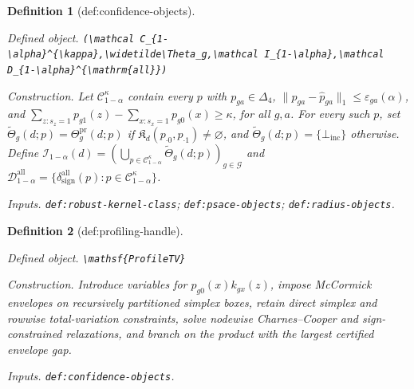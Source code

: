 \documentclass{article}
\newtheorem{definition}{Definition}
\begin{document}
\begin{definition}[def:confidence-objects]\label{def:confidence-objects}
\par\smallskip\noindent\emph{Defined object.} \texttt{(\textbackslash{}\allowbreak{}mathcal C\_\allowbreak{}\{1-\allowbreak{}\textbackslash{}\allowbreak{}alpha\}\allowbreak{}\textasciicircum{}\{\textbackslash{}\allowbreak{}kappa\}\allowbreak{},\allowbreak{}\textbackslash{}\allowbreak{}widetilde\textbackslash{}\allowbreak{}Theta\_\allowbreak{}g,\allowbreak{}\textbackslash{}\allowbreak{}mathcal I\_\allowbreak{}\{1-\allowbreak{}\textbackslash{}\allowbreak{}alpha\}\allowbreak{},\allowbreak{}\textbackslash{}\allowbreak{}mathcal D\_\allowbreak{}\{1-\allowbreak{}\textbackslash{}\allowbreak{}alpha\}\allowbreak{}\textasciicircum{}\{\textbackslash{}\allowbreak{}mathrm\{all\}\allowbreak{}\}\allowbreak{})}
\par\smallskip\noindent\emph{Construction.} Let \(\mathcal C_{1-\alpha}^{\kappa}\) contain every \(p\) with \(p_{ga}\in\Delta_4\), \(\|p_{ga}-\widehat p_{ga}\|_1\le\varepsilon_{ga}(\alpha)\), and \(\sum_{z:s_z=1}p_{g1}(z)-\sum_{x:s_x=1}p_{g0}(x)\ge\kappa\), for all \(g,a\). For every such \(p\), set \(\widetilde\Theta_g(d;p)=\Theta_g^{\mathrm{pr}}(d;p)\) if \(\mathfrak K_d(p_{\cdot0},p_{\cdot1})\neq\varnothing\), and \(\widetilde\Theta_g(d;p)=\{\bot_{\mathrm{inc}}\}\) otherwise. Define \(\mathcal I_{1-\alpha}(d)=(\bigcup_{p\in\mathcal C_{1-\alpha}^{\kappa}}\widetilde\Theta_g(d;p))_{g\in\mathcal G}\) and \(\mathcal D_{1-\alpha}^{\mathrm{all}}=\{\delta_{\mathrm{sign}}^{\mathrm{all}}(p):p\in\mathcal C_{1-\alpha}^{\kappa}\}\).
\par\smallskip\noindent\emph{Inputs.} \texttt{def:\allowbreak{}robust-\allowbreak{}kernel-\allowbreak{}class}; \texttt{def:\allowbreak{}psace-\allowbreak{}objects}; \texttt{def:\allowbreak{}radius-\allowbreak{}objects}.
\end{definition}

\begin{definition}[def:profiling-handle]\label{def:profiling-handle}
\par\smallskip\noindent\emph{Defined object.} \texttt{\textbackslash{}\allowbreak{}mathsf\{ProfileTV\}\allowbreak{}}
\par\smallskip\noindent\emph{Construction.} Introduce variables for \(p_{g0}(x)k_{gx}(z)\), impose McCormick envelopes on recursively partitioned simplex boxes, retain direct simplex and rowwise total-variation constraints, solve nodewise Charnes--Cooper and sign-constrained relaxations, and branch on the product with the largest certified envelope gap.
\par\smallskip\noindent\emph{Inputs.} \texttt{def:\allowbreak{}confidence-\allowbreak{}objects}.
\end{definition}
\end{document}
